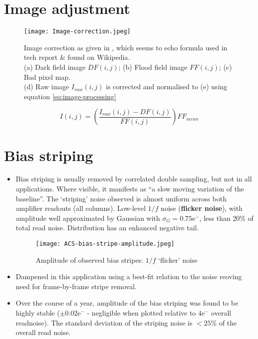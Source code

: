 \documentclass[10pt,fleqn]{article}
\begin{document}
\section{Image adjustment}

\begin{figure}[!h]
\caption{Image correction as given in \cite{aSiPanelDamage}, which seems to echo formula used in tech report \& found on Wikipedia. \\
(a) Dark field image $DF(i,j)$; (b) Flood field image $FF(i,j)$; (c) Bad pixel map. \\
(d) Raw image $I_{raw}(i,j)$ is corrected and normalised to (e) using equation \ref{eq:image-processing}}
\centering

\texttt{[image: Image-correction.jpeg]}
\end{figure}

\begin{equation}
\label{eq:image-processing}
I(i,j) = \left(\frac{I_{raw}(i,j) - DF(i,j)}{FF(i,j)} \right) FF_{mean}
\end{equation}

\section{Bias striping \cite{biasStriping2011}}
\begin{itemize}

\item Bias striping is usually removed by correlated double sampling, but not in all applications. Where visible, it manifests as ``a slow moving variation of the baseline''. The `striping' noise observed is almost uniform across both amplifier readouts (all columns). Low-level $1/f$ noise (\textbf{flicker noise}), with amplitude well approximated by Gaussian with $\sigma_G = 0.75\text{e}^-$, less than 20\% of total read noise. Distribution has an enhanced negative tail.

\begin{figure}[!h]
\caption{Amplitude of observed bias stripes: $1/f$ `flicker' noise}
\centering
\texttt{[image: ACS-bias-stripe-amplitude.jpeg]}
\end{figure}

\item Dampened in this application using a best-fit relation to the noise reoving need for frame-by-frame stripe removal.

\item Over the course of a year, amplitude of the bias striping was found to be highly stable ($\pm 0.02\text{e}^-$ - negligible when plotted relative to $4\text{e}^-$ overall readnoise). The standard deviation of the striping noise is $< 25\%$ of the overall read noise.
\end{itemize}
\end{document}
